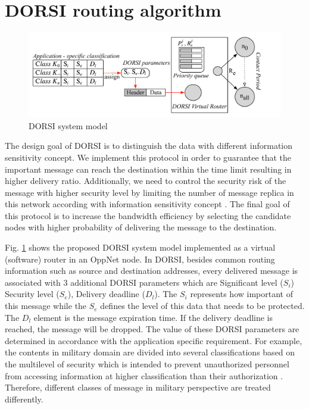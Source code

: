 \section{DORSI routing algorithm}
\label{DORSI:DORSI routing algorithm}
\begin{figure}[!t]
\centering
\includegraphics[width=5in]{Figures/DORSIsystemModel.pdf}
\caption{DORSI system model}
\label{DORSI system model}
\end{figure}

The design goal of DORSI is to distinguish the data with different information sensitivity concept. 
We implement this protocol in order to guarantee that the important message can reach the destination within the time limit resulting in higher delivery ratio. 
Additionally, we need to control the security risk of the message with higher security level by limiting the number of message replica in this network according with information sensitivity concept \cite{Kotrappa2010,marking2010}. 
The final goal of this protocol is to increase the bandwidth efficiency by selecting the candidate nodes with higher probability of delivering the message to the destination.

Fig. \ref{DORSI system model} shows the proposed DORSI system model implemented as a virtual (software) router in an OppNet node. 
In DORSI, besides common routing information such as source and destination addresses, every delivered message is associated with 3 additional DORSI parameters which are Significant level ($S_i$) Security level ($S_e$), Delivery deadline ($D_l$). 
The $S_i$ represents how important of this message while the $S_e$ defines the level of this data that needs to be protected. 
The $D_l$ element is the message expiration time. 
If the delivery deadline is reached, the message will be dropped. 
The value of these DORSI parameters are determined in accordance with the application specific requirement. 
For example, the contents in military domain are divided into several classifications based on the multilevel of security which is intended to prevent unauthorized personnel from accessing information at higher classification than their authorization \cite{Winjum2008}. 
Therefore, different classes of message in military perspective are treated differently.


